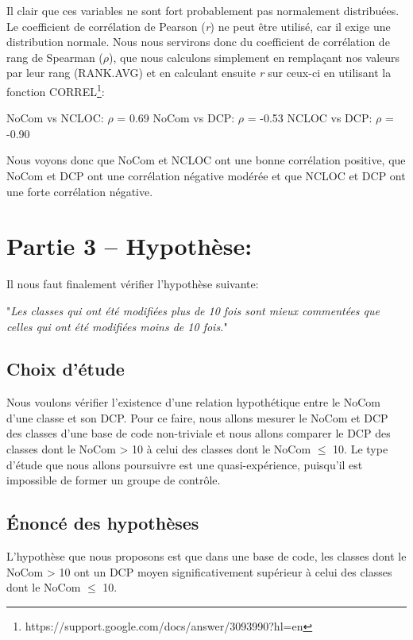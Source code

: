 \documentclass{article}
\begin{document}
Il clair que ces variables ne sont fort probablement pas normalement distribuées.
Le coefficient de corrélation de Pearson (\emph{r}) ne peut être utilisé, car il exige une distribution normale.
Nous nous servirons donc du coefficient de corrélation de rang de Spearman ($\rho$), que nous calculons simplement en remplaçant nos valeurs par leur rang (RANK.AVG)
et en calculant ensuite \emph{r} sur ceux-ci en utilisant la fonction CORREL\footnote{https://support.google.com/docs/answer/3093990?hl=en}:
\begin{center}
NoCom vs NCLOC: $\rho$ = 0.69\hspace{1cm}
NoCom vs DCP: $\rho$ = -0.53\hspace{1cm}
NCLOC vs DCP: $\rho$ = -0.90
\end{center}
Nous voyons donc que NoCom et NCLOC ont une bonne corrélation positive, que NoCom et DCP ont une corrélation négative modérée
et que NCLOC et DCP ont une forte corrélation négative.

\vspace*{\fill}
\section{Partie 3 -- Hypothèse:}

Il nous faut finalement vérifier l'hypothèse suivante:
\begin{center}
    "\emph{Les classes qui ont été modifiées plus de 10 fois sont mieux commentées que celles qui ont été modifiées moins de 10 fois.}"
\end{center}

\subsection{Choix d'étude}
Nous voulons vérifier l'existence d'une relation hypothétique entre le NoCom d'une classe et son DCP.
Pour ce faire, nous allons mesurer le NoCom et DCP des classes d'une base de code non-triviale
et nous allons comparer le DCP des classes dont le NoCom > 10 à celui des classes dont le NoCom $\leq$ 10.
Le type d'étude que nous allons poursuivre est une quasi-expérience, puisqu'il est impossible de former un groupe de contrôle.

\subsection{Énoncé des hypothèses}
L’hypothèse que nous proposons est que dans une base de code, les classes dont le NoCom > 10 ont un DCP
moyen significativement supérieur à celui des classes dont le NoCom $\leq$ 10.
\end{document}
